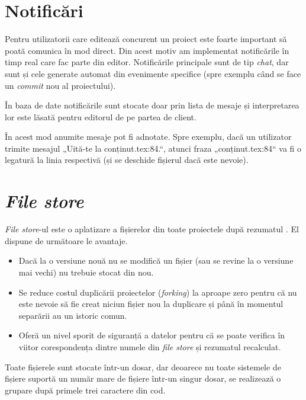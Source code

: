 \documentclass[a4wide,12pt]{report}
\newcommand{\eng}[1]{\emph{#1}} %
\newcommand{\acr}[1]{{\textsmaller[1]{\textsc{#1}}}} %
\begin{document}
\section{Notificări}
\label{notificarisec}

Pentru utilizatorii care editează concurent un proiect este foarte important să
poată comunica în mod direct. Din acest motiv am implementat notificările în
timp real care fac parte din editor. Notificările principale sunt de tip
\eng{chat}, dar sunt și cele generate automat din evenimente specifice (spre
exemplu când se face un \eng{commit} nou al proiectului).

În baza de date notificările sunt stocate doar prin lista de mesaje și
interpretarea lor este lăsată pentru editorul de pe partea de client.

În acest mod anumite mesaje pot fi adnotate. Spre exemplu, dacă un utilizator
trimite mesajul „Uită-te la conținut.tex:84.“, atunci fraza „conținut.tex:84“ va
fi o legatură la linia respectivă (și se deschide fișierul dacă este nevoie).

\section{\eng{File store}}

\eng{File store}-ul este o aplatizare a fișierelor din toate proiectele după
rezumatul \acr{SHA1}. El dispune de următoare le avantaje.

\begin{itemize}

\item Dacă la o versiune nouă nu se modifică un fișier (sau se revine la o
versiune mai vechi) nu trebuie stocat din nou.

\item Se reduce costul duplicării proiectelor (\eng{forking}) la aproape zero
pentru că nu este nevoie să fie creat niciun fișier nou la duplicare și până în
momentul separării au un istoric comun.

\item Oferă un nivel sporit de siguranță a datelor pentru că se poate verifica
în viitor corespondența dintre numele din \eng{file store} și rezumatul
\acr{SHA1} recalculat.

\end{itemize}

Toate fișierele sunt stocate într-un dosar, dar deoarece nu toate sistemele de
fișiere suportă un număr mare de fișiere într-un singur dosar, se realizează o
grupare după primele trei caractere din cod.
\end{document}
